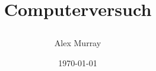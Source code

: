 \title{
    \author{Alex Murray}
    \vspace{25mm}
    \vspace{20mm}
    \large{Computerversuch} \\
    \date{\today}
}
